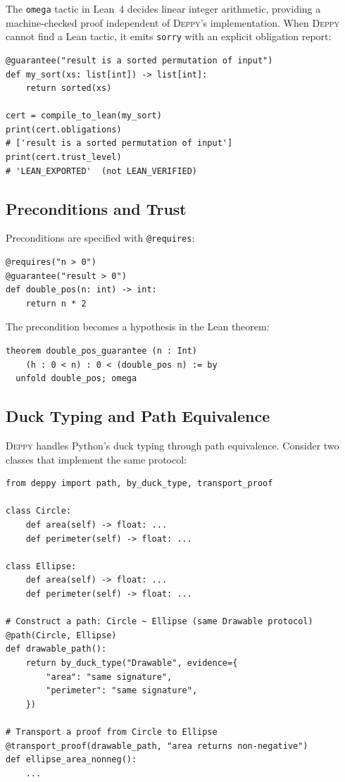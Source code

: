 \documentclass[acmsmall,nonacm,screen]{acmart}
\newcommand{\deppy}{\textsc{Deppy}}
\begin{document}
The \texttt{omega} tactic in Lean~4 decides linear integer arithmetic,
providing a machine-checked proof independent of \deppy{}'s
implementation.  When \deppy{} cannot find a Lean tactic, it emits
\texttt{sorry} with an explicit obligation report:

\begin{lstlisting}[language=deppy]
@guarantee("result is a sorted permutation of input")
def my_sort(xs: list[int]) -> list[int]:
    return sorted(xs)

cert = compile_to_lean(my_sort)
print(cert.obligations)
# ['result is a sorted permutation of input']
print(cert.trust_level)
# 'LEAN_EXPORTED'  (not LEAN_VERIFIED)
\end{lstlisting}

\subsection{Preconditions and Trust}

Preconditions are specified with \texttt{@requires}:

\begin{lstlisting}[language=deppy]
@requires("n > 0")
@guarantee("result > 0")
def double_pos(n: int) -> int:
    return n * 2
\end{lstlisting}

The precondition becomes a hypothesis in the Lean theorem:

\begin{lstlisting}[language=lean4]
theorem double_pos_guarantee (n : Int)
    (h : 0 < n) : 0 < (double_pos n) := by
  unfold double_pos; omega
\end{lstlisting}

\subsection{Duck Typing and Path Equivalence}

\deppy{} handles Python's duck typing through path equivalence.
Consider two classes that implement the same protocol:

\begin{lstlisting}[language=deppy]
from deppy import path, by_duck_type, transport_proof

class Circle:
    def area(self) -> float: ...
    def perimeter(self) -> float: ...

class Ellipse:
    def area(self) -> float: ...
    def perimeter(self) -> float: ...

# Construct a path: Circle ~ Ellipse (same Drawable protocol)
@path(Circle, Ellipse)
def drawable_path():
    return by_duck_type("Drawable", evidence={
        "area": "same signature",
        "perimeter": "same signature",
    })

# Transport a proof from Circle to Ellipse
@transport_proof(drawable_path, "area returns non-negative")
def ellipse_area_nonneg():
    ...
\end{lstlisting}
\end{document}
